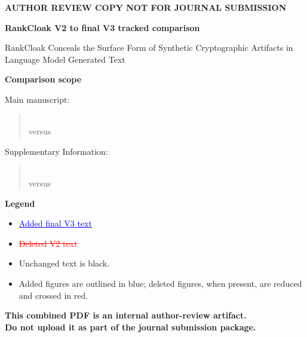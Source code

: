 \documentclass[11pt]{article}
\begin{document}
\begin{center}
\vspace*{0.5in}
{\color{red}\bfseries\LARGE AUTHOR REVIEW COPY NOT FOR JOURNAL SUBMISSION\par}
\vspace{0.45in}
{\Large\bfseries RankCloak V2 to final V3 tracked comparison\par}
\vspace{0.25in}
{\large RankCloak Conceals the Surface Form of Synthetic Cryptographic Artifacts in Language Model Generated Text\par}
\end{center}

\vspace{0.45in}
\noindent\textbf{Comparison scope}

\medskip
\noindent Main manuscript:
\begin{quote}
\small\texttt{}\\
versus\\
\texttt{}
\end{quote}

\noindent Supplementary Information:
\begin{quote}
\small\texttt{}\\
versus\\
\texttt{}
\end{quote}

\vspace{0.2in}
\noindent\textbf{Legend}

\begin{itemize}
  \item \textcolor{blue}{\uline{Added final V3 text}}
  \item \textcolor{red}{\sout{Deleted V2 text}}
  \item Unchanged text is black.
  \item Added figures are outlined in blue; deleted figures, when present, are reduced and crossed in red.
\end{itemize}

\vfill
\begin{center}
\color{red}\bfseries
This combined PDF is an internal author-review artifact.\\
Do not upload it as part of the journal submission package.
\end{center}
\end{document}
